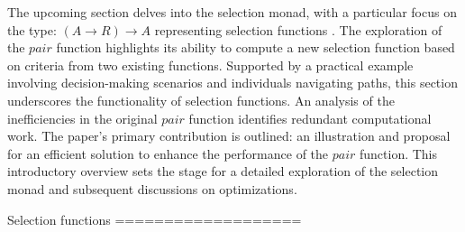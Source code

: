 The upcoming section delves into the selection monad, with a particular focus on the type:  
$(A \rightarrow R) \rightarrow A$ representing selection functions 
\cite{escardo2010selection}. The exploration of the $pair$ function highlights its ability 
to compute a new selection function based on criteria from two existing functions. 
Supported by a practical example involving decision-making scenarios and individuals 
navigating paths, this section underscores the functionality of selection functions. An 
analysis of the inefficiencies in the original $pair$ function identifies redundant 
computational work. The paper's primary contribution is outlined: an illustration and 
proposal for an efficient solution to enhance the performance of the $pair$ function. This 
introductory overview sets the stage for a detailed exploration of the selection monad and 
subsequent discussions on optimizations.

Selection functions
===================

